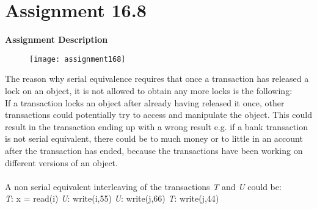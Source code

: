 \section{Assignment 16.8}
\textbf{Assignment Description}
\begin{figure}[H]
	\texttt{[image: assignment168]}
\end{figure}
The reason why serial equivalence requires that once a transaction has released a lock on an object, it is not allowed to obtain any more locks is the following:\\
If a transaction locks an object after already having released it once, other transactions could potentially try to access and manipulate the object. This could result in the transaction ending up with a wrong result e.g. if a bank transaction is not serial equivalent, there could be to much money or to little in an account after the transaction has ended, because the transactions have been working on different versions of an object.\\\\
A non serial equivalent interleaving of the transactions \textit{T} and \textit{U} could be:\\
\textit{T}: x = read(i)
\textit{U}: write(i,55)
\textit{U}: write(j,66)
\textit{T}: write(j,44)
